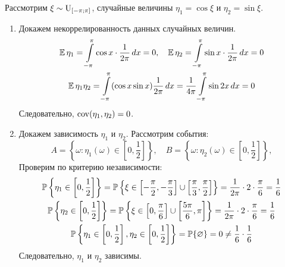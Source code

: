\hypertarget{counter_exmp_independence}{}
\begin{exmp}
    Рассмотрим $\xi \sim \operatorname{\mathrm{U}}_{[-\pi;\pi]}$, случайные величины ${\eta_{1}=\cos \xi}$ и ${\eta_{2}=\sin \xi}$.
    \begin{enumerate}
        \item 
            Докажем некоррелированность данных случайных величин.
            \begin{gather*}
                \operatorname{\mathbb{E}} \eta_{1}=\int\limits_{-\pi}^{\pi} \cos x \cdot \frac{1}{2 \pi} \,d x=0, \quad \operatorname{\mathbb{E}} \eta_{2}=\int\limits_{-\pi}^{\pi} \sin x \cdot \frac{1}{2 \pi} \,d x=0 \\
                \operatorname{\mathbb{E}} \eta_{1} \eta_{2}=\int\limits_{-\pi}^{\pi}(\cos x \sin x) \frac{1}{2 \pi} \,d x=\frac{1}{4 \pi} \int\limits_{-\pi}^{\pi} \sin 2 x \,d x=0
            \end{gather*}
            Следовательно, $\operatorname{cov}(\eta_1, \eta_2) = 0$.
        \item 
            Докажем зависимость $\eta_1$ и $\eta_2$. Рассмотрим события:
            \begin{equation*}
                A = \left\{\omega \colon \eta_1(\omega) \in \left[0, \frac{1}{2} \right] \right\}, \quad
                B = \left\{\omega \colon \eta_2(\omega) \in \left[0, \frac{1}{2} \right] \right\},
            \end{equation*}
            Проверим по критерию независимости:
            \begin{gather*}
                \operatorname{\mathbb{P}}\left\{\eta_{1} \in\left[0, \frac{1}{2}\right]\right\}=\operatorname{\mathbb{P}}\left\{\xi \in\left[-\frac{\pi}{2},-\frac{\pi}{3}\right] \cup\left[\frac{\pi}{3}, \frac{\pi}{2}\right]\right\}=\frac{1}{2 \pi} \cdot 2 \cdot \frac{\pi}{6}=\frac{1}{6} \\
                \operatorname{\mathbb{P}}\left\{\eta_{2} \in\left[0, \frac{1}{2}\right]\right\}=\operatorname{\mathbb{P}}\left\{\xi \in\left[0, \frac{\pi}{6}\right] \cup\left[\frac{5 \pi}{6}, \pi\right]\right\}=\frac{1}{2 \pi} \cdot 2 \cdot \frac{\pi}{6}=\frac{1}{6} \\
                \operatorname{\mathbb{P}}\left\{\eta_{1} \in\left[0, \frac{1}{2}\right], \eta_{2} \in\left[0, \frac{1}{2}\right]\right\}=\operatorname{\mathbb{P}}\{\varnothing\}=0 \neq \frac{1}{6} \cdot \frac{1}{6}
            \end{gather*}
            Следовательно, $\eta_1$ и $\eta_2$ зависимы.
    \end{enumerate}
\end{exmp}

